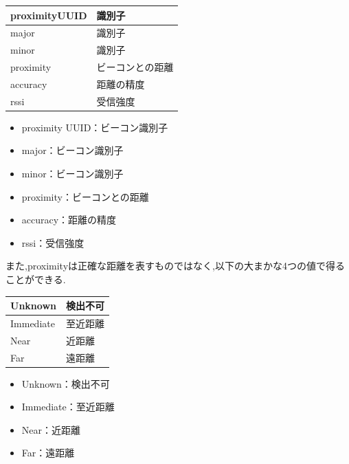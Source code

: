 \begin{center}
\begin{table}[htb]
\begin{tabular}{|l|l|}  \hline
proximityUUID & 識別子 \\ \hline
major & 識別子 \\  \hline
minor & 識別子 \\ \hline
proximity & ビーコンとの距離 \\ \hline
accuracy & 距離の精度 \\ \hline
rssi & 受信強度 \\ \hline
\end{tabular}
\end{table}
\end{center}

\begin{itemize}
\item proximity UUID：ビーコン識別子
\item major：ビーコン識別子
\item minor：ビーコン識別子
\item proximity：ビーコンとの距離
\item accuracy：距離の精度
\item rssi：受信強度
\end{itemize}

また,proximityは正確な距離を表すものではなく,以下の大まかな4つの値で得ることができる.

\begin{center}
\begin{table}[htb]
\begin{tabular}{|l|l|} \hline
Unknown & 検出不可 \\ \hline
Immediate & 至近距離 \\ \hline
Near & 近距離 \\ \hline
Far & 遠距離 \\ \hline
\end{tabular}
\end{table}
\end{center}

\begin{itemize}
\item Unknown：検出不可
\item Immediate：至近距離
\item Near：近距離
\item Far：遠距離
\end{itemize}
